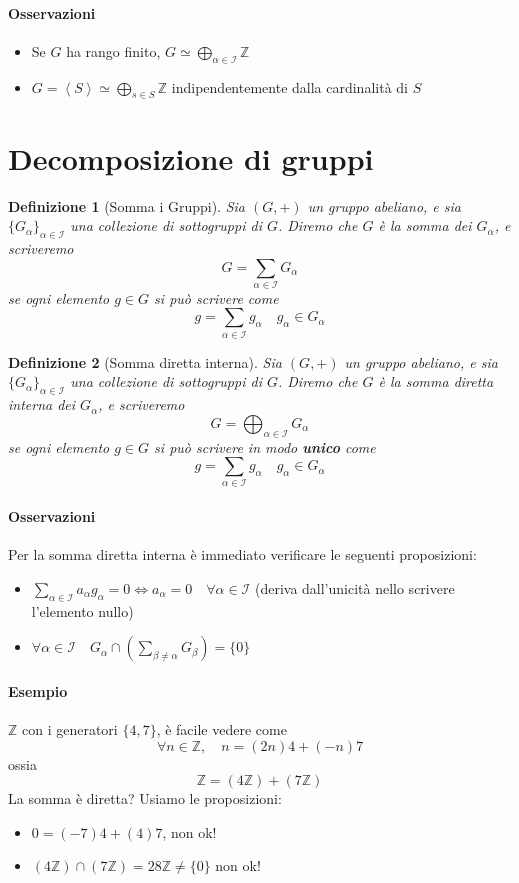 \documentclass[a4paper]{report}
\newtheorem{definition}{Definizione}
\newcommand{\Z}{\ensuremath{\mathbb{Z}}}
\newcommand{\gen}[1]{\ensuremath{\left<{#1}\right>}}
\begin{document}
\paragraph{Osservazioni}
\begin{itemize}
    \item Se $G$ ha rango finito, $G\simeq\bigoplus_{\alpha\in\mathcal{I}}\Z$
    \item $G=\gen{S}\simeq\bigoplus_{s\in S}\Z$ indipendentemente dalla cardinalità di $S$
\end{itemize}
\pagebreak
\section{Decomposizione di gruppi}
\begin{definition}[Somma i Gruppi]
    Sia $(G,+)$ un gruppo abeliano, e sia $\{G_\alpha\}_{\alpha\in\mathcal{I}}$ una collezione di sottogruppi di $G$. Diremo che $G$ è la somma dei $G_\alpha$, e scriveremo
    \[
        G=\sum_{\alpha\in\mathcal{I}}G_\alpha
    \]
    se ogni elemento $g\in G$ si può scrivere come
    \[
        g=\sum_{\alpha\in\mathcal{I}}g_\alpha\quad g_\alpha\in G_\alpha
    \]
\end{definition}
\begin{definition}[Somma diretta interna]
    Sia $(G,+)$ un gruppo abeliano, e sia $\{G_\alpha\}_{\alpha\in\mathcal{I}}$ una collezione di sottogruppi di $G$. Diremo che $G$ è la somma diretta interna dei $G_\alpha$, e scriveremo
    \[
        G=\bigoplus_{\alpha\in\mathcal{I}}G_\alpha
    \]
    se ogni elemento $g\in G$ si può scrivere in modo \textbf{unico} come
    \[
        g=\sum_{\alpha\in\mathcal{I}}g_\alpha\quad g_\alpha\in G_\alpha
    \]
\end{definition}
\paragraph{Osservazioni} Per la somma diretta interna è immediato verificare le seguenti proposizioni:
\begin{itemize}
    \item $\sum_{\alpha\in\mathcal{I}}a_\alpha g_\alpha=0\Longleftrightarrow a_\alpha=0\quad \forall\alpha\in\mathcal{I}$ (deriva dall'unicità nello scrivere l'elemento nullo)
    \item $\forall\alpha\in\mathcal{I}\quad G_\alpha\cap\left(\sum_{\beta\neq\alpha}G_\beta\right)=\{0\}$
\end{itemize}
\paragraph{Esempio}
$\Z$ con i generatori $\{4,7\}$, è facile vedere come
\[
    \forall n\in\Z,\quad n=(2n)4+(-n)7
\]
ossia
\[
    \Z=(4\Z)+(7\Z)
\]
La somma è diretta? Usiamo le proposizioni:
\begin{itemize}
    \item $0=(-7)4+(4)7$, non ok!
    \item $(4\Z)\cap(7\Z)=28\Z\neq\{0\}$ non ok!
\end{itemize}
\pagebreak
\end{document}
